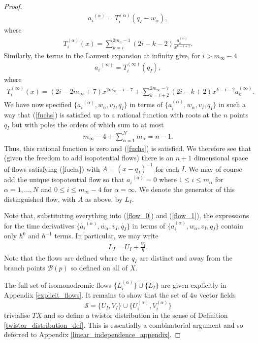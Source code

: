 \documentclass[a4paper,12pt,reqno]{amsart}
\numberwithin{equation}{section}
\numberwithin{counter2}{section}
\begin{document}
\begin{proof}
\begin{align}
{\dot{a_i}^{(\alpha)}} = {T^{(\alpha)}_i(q_I-w_\alpha)},   
\end{align}
where
\begin{align}
T_i^{(\alpha)}(x) = \sum_{k=i}^{2m_\alpha-1}(2i-k-2)\frac{a_k^{(\alpha)}}{x^{k-i+2}}.  
\end{align}
Similarly,  the terms in the Laurent expansion at infinity give,  for $i > m_\infty - 4$
 \begin{align}
 \dot{a_{i}}^{(\infty)} = T_{i}^{(\infty)}(q_I),  
 \end{align}
 where 
 \begin{align}
 T_{i}^{(\infty)}(x) = (2i-2m_\infty + 7)x^{2m_\infty-i-7} + \sum_{k=i+2}^{2m_\infty - 7}(2i-k+2)x^{k-i-2}a_k^{(\infty)}.  
 \end{align}
 We have now specified $\{\dot{a_i}^{(\alpha)}, \dot{w_\alpha}, \dot{v_I},  \dot{q_I}\}$ in terms of $\{a_i^{(\alpha)}, w_\alpha,  v_I,  q_{I}\}$ in such a way that (\ref{fuchs}) is satisfied up to a rational function with roots at the $n$ points $q_I$ but with poles the orders of which sum to at most
\begin{align}
  m_\infty - 4 + \sum_{\alpha = 1}^N  m_\alpha  = n - 1. 
 \end{align} 
   Thus,  this rational function is zero and (\ref{fuchs}) is satisfied.  We therefore see that (given the freedom to add isopotential flows) there is an $n+1$ dimensional space of flows satisfying (\ref{fuchs}) with $A = (x-q_I)^{-1}$ for each $I$.  We may of course add the unique isopotential flow so that $\dot{a_i}^{(\alpha)}=0$ where $1 \le i \le m_\alpha$ for $\alpha = 1,...,N$ and $0 \le i \le m_\infty - 4$ for $\alpha = \infty$.  We denote the generator of this distinguished flow,  with $A$ as above,  by $L_I$.  \par 
Note that,  substituting everything into (\ref{flow_0}) and (\ref{flow_1}),  the expressions for the time derivatives $\{\dot{a_i}^{(\alpha)}, \dot{w_\alpha}, \dot{v_I},  \dot{q_I}\}$ in terms of $\{a_i^{(\alpha)}, w_\alpha,  v_I,  q_{I}\}$ contain only $\hbar^0$ and $\hbar^{-1}$ terms.  In particular,  we may write
\begin{align}
L_I = U_I + \frac{V_I}{\hbar}.  
\end{align}
Note that the flows are defined where the $q_I$ are distinct and away from the branch points $\mathcal{B}(p)$ so defined on all of $X$.  \par The full set of isomonodromic flows $\{L_i^{(\alpha)}\} \cup \{L_I\}$ are given explicitly in Appendix \ref{explicit_flows}.
It remains to show that the set of $4n$ vector fields
 $$\mathcal{S} = \{U_I,V_I\} \cup \{U_i^{(\alpha)},V_i^{(\alpha)}\} $$ trivialise $TX$ and so define a twistor distribution in the sense of Definition \ref{twistor_distribution_def}.  
 This is essentially a combinatorial argument and so deferred to Appendix \ref{linear_independence_appendix}.  
 \end{proof}
 
\end{document}
